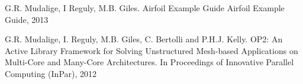\documentclass[11pt]{article}
\begin{document}

\begin{thebibliography}{unsrt}

G.R. Mudalige, I Reguly, M.B. Giles. Airfoil Example Guide
Airfoil Example Guide, 2013

G.R. Mudalige, I. Reguly, M.B. Giles, C. Bertolli and P.H.J. Kelly. OP2: An Active Library Framework for Solving Unstructured Mesh-based Applications on Multi-Core and Many-Core Architectures. In Proceedings of Innovative Parallel Computing (InPar), 2012
\end{thebibliography}
\end{document}
